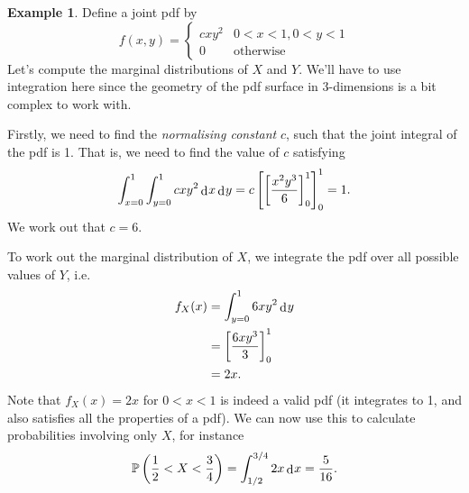 \documentclass[
]{book}
\newcommand{\bbP}{\mathbb{P}}
\DeclareMathOperator{\dd}{d}
\newcommand{\dint}{\dd\hspace{0.5pt}\!}
\theoremstyle{definition}
\theoremstyle{definition}
\newtheorem{example}{Example}[chapter]
\theoremstyle{definition}
\theoremstyle{definition}
\theoremstyle{remark}
\begin{document}
\begin{example}
Define a joint pdf by
\[
f(x,y) = \begin{cases}
cxy^2 & 0<x<1, 0<y<1\\
0 &\text{otherwise}
\end{cases}
\]
Let's compute the marginal distributions of \(X\) and \(Y\).
We'll have to use integration here since the geometry of the pdf surface in 3-dimensions is a bit complex to work with.

Firstly, we need to find the \emph{normalising constant} \(c\), such that the joint integral of the pdf is 1.
That is, we need to find the value of \(c\) satisfying
\[
\int_{x=0}^1 \int_{y=0}^1 cxy^2 \dint x \dint y = c\left[ \left[ \frac{x^2y^3}{6} \right]_{0}^{1} \right]_{0}^{1} = 1.
\]
We work out that \(c=6\).

To work out the marginal distribution of \(X\), we integrate the pdf over all possible values of \(Y\), i.e.
\begin{align*}
f_X(x) &= \int_{y=0}^1 6xy^2 \dint y \\
&= \left[\frac{6xy^3}{3} \right]_0^1 \\
&= 2x.
\end{align*}
Note that \(f_X(x)=2x\) for \(0<x<1\) is indeed a valid pdf (it integrates to 1, and also satisfies all the properties of a pdf).
We can now use this to calculate probabilities involving only \(X\), for instance
\[
\bbP\left(\frac{1}{2} < X < \frac{3}{4}\right) = \int_{1/2}^{3/4} 2x \dint x = \frac{5}{16}.
\]
\end{example}
\end{document}
